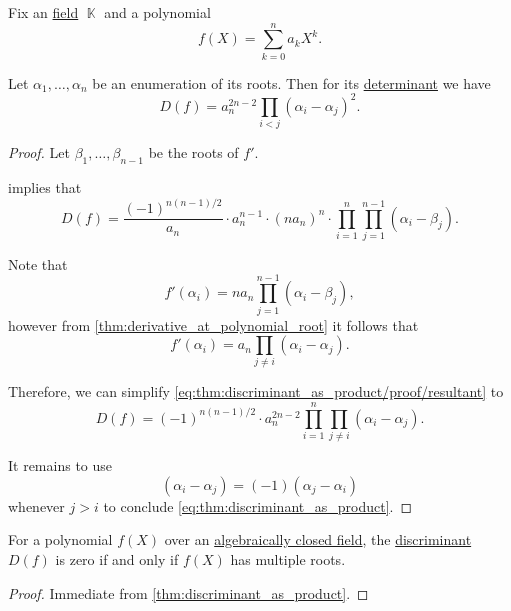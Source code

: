 \begin{proposition}\label{thm:discriminant_as_product}
  Fix an \hyperref[def:algebraically_closed_field]{} \hyperref[def:field]{field} \( \BbbK \) and a polynomial
  \begin{equation*}
    f(X) = \sum_{k=0}^n a_k X^k.
  \end{equation*}

  Let \( \alpha_1, \ldots, \alpha_n \) be an enumeration of its roots. Then for its \hyperref[def:matrix_determinant]{determinant} we have
  \begin{equation}\label{eq:thm:discriminant_as_product}
    D(f) = a_n^{2n - 2} \prod_{i < j} (\alpha_i - \alpha_j)^2.
  \end{equation}
\end{proposition}
\begin{proof}
  Let \( \beta_1, \ldots, \beta_{n-1} \) be the roots of \( f' \).

   implies that
  \begin{equation}\label{eq:thm:discriminant_as_product/proof/resultant}
    D(f) = \frac {(-1)^{n(n-1)/2}} {a_n} \cdot a_n^{n-1} \cdot (n a_n)^n \cdot \prod_{i=1}^n \prod_{j=1}^{n-1} (\alpha_i - \beta_j).
  \end{equation}

  Note that
  \begin{equation*}
    f'(\alpha_i) = n a_n \prod_{j=1}^{n-1} (\alpha_i - \beta_j),
  \end{equation*}
  however from \cref{thm:derivative_at_polynomial_root} it follows that
  \begin{equation*}
    f'(\alpha_i) = a_n \prod_{j \neq i} (\alpha_i - \alpha_j).
  \end{equation*}

  Therefore, we can simplify \eqref{eq:thm:discriminant_as_product/proof/resultant} to
  \begin{equation*}
    D(f) = (-1)^{n(n-1)/2} \cdot a_n^{2n-2} \prod_{i=1}^n \prod_{j \neq i} (\alpha_i - \alpha_j).
  \end{equation*}

  It remains to use
  \begin{equation*}
    (\alpha_i - \alpha_j) = (-1)(\alpha_j - \alpha_i)
  \end{equation*}
  whenever \( j > i \) to conclude \eqref{eq:thm:discriminant_as_product}.
\end{proof}

\begin{corollary}\label{thm:discriminant_invertibility}
  For a polynomial \( f(X) \) over an \hyperref[def:algebraically_closed_field]{algebraically closed field}, the \hyperref[def:discriminant]{discriminant} \( D(f) \) is zero if and only if \( f(X) \) has multiple roots.
\end{corollary}
\begin{proof}
  Immediate from \cref{thm:discriminant_as_product}.
\end{proof}

